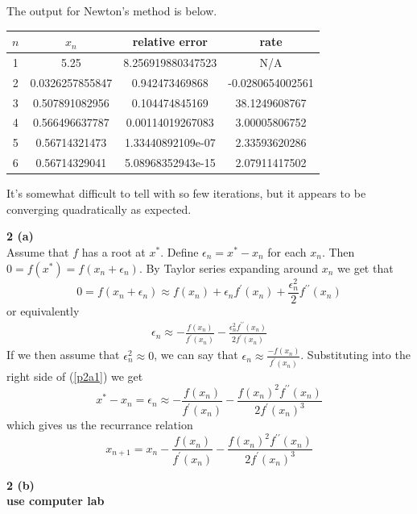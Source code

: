 \documentclass[12pt]{article}
\newcommand{\problem}[1]{\hspace{-4 ex} \large \textbf{#1}\\}
\begin{document}
	The output for Newton's method is below.
	\begin{center}
	    \begin{tabular}{|c|c|c|c|}
	    	\hline
	    	$n$&$x_n$&relative error&rate\\ \hline
	    	1&5.25&8.256919880347523&N/A\\ \hline
	    	2&0.0326257855847&0.942473469868&-0.0280654002561\\ \hline
	    	3&0.507891082956&0.104474845169&38.1249608767\\ \hline
	    	4&0.566496637787&0.00114019267083&3.00005806752\\ \hline
	    	5&0.56714321473&1.33440892109e-07&2.33593620286\\ \hline
	    	6&0.56714329041&5.08968352943e-15&2.07911417502\\ \hline
	    \end{tabular}
	\end{center}
    It's somewhat difficult to tell with so few iterations, but it appears to be converging quadratically as expected.
    
\problem{2 (a)}
	Assume that $f$ has a root at $x^*$. Define $\epsilon_n = x^*-x_n$ for each $x_n$. Then $0 = f(x^*) = f(x_n + \epsilon_n)$. By Taylor series expanding around $x_n$ we get that 
	$$
	0 = f(x_n + \epsilon_n) \approx f(x_n) + \epsilon_n f^\prime(x_n) + \frac{\epsilon_n^2}{2}f^{\prime\prime}(x_n)
	$$
	or equivalently
	\begin{align}\label{p2a1}
	\epsilon_n \approx -\frac{f(x_n)}{f^\prime(x_n)} - \frac{\epsilon_n^2f^{\prime\prime}(x_n)}{2f^\prime(x_n)}
	\end{align}
	If we then assume that $\epsilon_n^2 \approx 0$, we can say that $\epsilon_n \approx \frac{-f(x_n)}{f^\prime(x_n)}$. Substituting into the right side of (\ref{p2a1}) we get 
	$$
	x^* - x_n = \epsilon_n \approx -\frac{f(x_n)}{f^\prime(x_n)} - \frac{f(x_n)^2f^{\prime\prime}(x_n)}{2f^\prime(x_n)^3}
	$$
	which gives us the recurrance relation
	$$
	x_{n+1} = x_n -\frac{f(x_n)}{f^\prime(x_n)} - \frac{f(x_n)^2f^{\prime\prime}(x_n)}{2f^\prime(x_n)^3}
	$$
	
\problem{2 (b)}
	\textbf{use computer lab}
	
\end{document}

